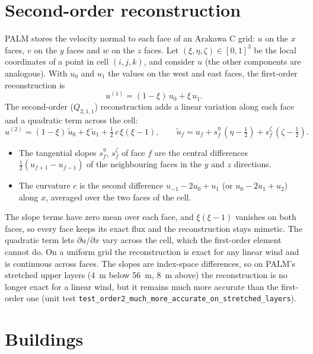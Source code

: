 \documentclass[11pt,a4paper]{article}
\begin{document}
\section{Second-order reconstruction}

PALM stores the velocity normal to each face of an Arakawa C grid: $u$ on the
$x$ faces, $v$ on the $y$ faces and $w$ on the $z$ faces. Let $(\xi,\eta,\zeta)\in[0,1]^3$
be the local coordinates of a point in cell $(i,j,k)$, and consider $u$ (the
other components are analogous). With $u_0$ and $u_1$ the values on the west and
east faces, the first-order reconstruction is
\begin{equation}
  u^{(1)} = (1-\xi)\,u_0 + \xi\,u_1 .
\end{equation}
The second-order ($Q_{2,1,1}$) reconstruction adds a linear variation along each
face and a quadratic term across the cell:
\begin{equation}
  u^{(2)} = (1-\xi)\,\tilde u_0 + \xi\,\tilde u_1 + \tfrac12\,c\,\xi(\xi-1),
  \qquad
  \tilde u_f = u_f + s^\eta_f\,(\eta-\tfrac12) + s^\zeta_f\,(\zeta-\tfrac12).
  \label{eq:order2}
\end{equation}
\begin{itemize}
  \item The tangential slopes $s^\eta_f$, $s^\zeta_f$ of face $f$ are the central
        differences $\tfrac12(u_{f+1}-u_{f-1})$ of the neighbouring faces in
        the $y$ and $z$ directions.
  \item The curvature $c$ is the second difference $u_{-1}-2u_0+u_1$ (or
        $u_0-2u_1+u_2$) along $x$, averaged over the two faces of the cell.
\end{itemize}
The slope terms have zero mean over each face, and $\xi(\xi-1)$ vanishes on both
faces, so every face keeps its exact flux and the reconstruction stays
mimetic. The quadratic term lets $\partial u/\partial x$ vary across the
cell, which the first-order element cannot do. On a uniform grid the
reconstruction is exact for any linear wind and is continuous across faces.
The slopes are index-space differences, so on PALM's stretched upper layers
(\SI{4}{m} below \SI{56}{m}, \SI{8}{m} above) the reconstruction is no longer exact for
a linear wind, but it remains much more accurate than the first-order one
(unit test \texttt{test\_order2\_much\_more\_accurate\_on\_stretched\_layers}).

\section{Buildings}
\end{document}
